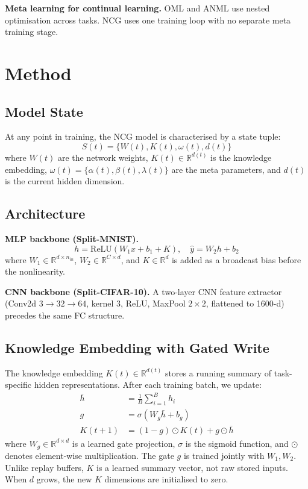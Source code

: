 \documentclass[conference]{IEEEtran}
\begin{document}
\textbf{Meta learning for continual learning.} OML \cite{javed2019} and ANML \cite{beaulieu2020} use nested optimisation across tasks. NCG uses one training loop with no separate meta training stage.

\section{Method}
\subsection{Model State}
At any point in training, the NCG model is characterised by a state tuple:
\begin{equation}
    S(t) = \{W(t), K(t), \omega(t), d(t)\}
\end{equation}
where $W(t)$ are the network weights, $K(t) \in \mathbb{R}^{d(t)}$ is the knowledge embedding, $\omega(t) = \{\alpha(t), \beta(t), \lambda(t)\}$ are the meta parameters, and $d(t)$ is the current hidden dimension.

\subsection{Architecture}
\textbf{MLP backbone (Split-MNIST).}
\begin{equation}
    h = \mathrm{ReLU}(W_1 x + b_1 + K), \quad \hat{y} = W_2 h + b_2
\end{equation}
where $W_1 \in \mathbb{R}^{d \times n_{in}}$, $W_2 \in \mathbb{R}^{C \times d}$, and $K \in \mathbb{R}^d$ is added as a broadcast bias before the nonlinearity.

\textbf{CNN backbone (Split-CIFAR-10).} A two-layer CNN feature extractor (Conv2d $3 \to 32 \to 64$, kernel 3, ReLU, MaxPool $2 \times 2$, flattened to 1600-d) precedes the same FC structure.

\subsection{Knowledge Embedding with Gated Write}
The knowledge embedding $K(t) \in \mathbb{R}^{d(t)}$ stores a running summary of task-specific hidden representations. After each training batch, we update:
\begin{align}
    \bar{h} &= \frac{1}{B} \sum_{i=1}^{B} h_i \\
    g &= \sigma(W_g \bar{h} + b_g) \\
    K(t + 1) &= (1 - g) \odot K(t) + g \odot \bar{h}
\end{align}
where $W_g \in \mathbb{R}^{d \times d}$ is a learned gate projection, $\sigma$ is the sigmoid function, and $\odot$ denotes element-wise multiplication. The gate $g$ is trained jointly with $W_1, W_2$. Unlike replay buffers, $K$ is a learned summary vector, not raw stored inputs. When $d$ grows, the new $K$ dimensions are initialised to zero.
\end{document}
